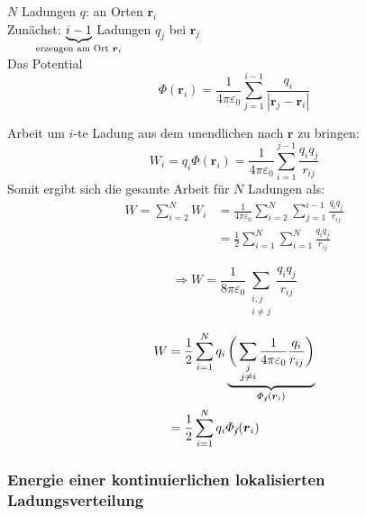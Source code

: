 \documentclass[titlepage,11pt,a4paper,ngerman]{report}
\renewcommand{\Phi}{\varPhi}
\newcommand{\kq}{\frac{1}{4\pi\epsilon_0}}
\newcommand{\summ}[2]{\sum_{#1}^{#2}}
\renewcommand{\vec}[1]{\boldsymbol{#1}}
\renewcommand{\epsilon}{\varepsilon}
\renewcommand{\paragraph}[1]{\subsubsection{#1}}
\begin{document}
$N$ Ladungen $q$: an Orten $\vec{r}_i$\\
Zunächst: $\underbrace{i - 1}_{\mathclap{\textrm{erzeugen am Ort } \vec{r}_i}}$ Ladungen $q_j$ bei $\vec{r}_j$\\
Das Potential
$$\Phi(\vec{r}_i) = \kq \summ{j = 1}{i - 1} \frac{q_i}{|\vec{r}_j - \vec{r}_i|}$$ 


Arbeit um $ i $-te Ladung aus dem unendlichen nach $ \vec{r} $ zu bringen:
\begin{equation*}
W_i = q_i \Phi(\vec{r}_i) = \frac{1}{4 \pi \epsilon_0} \sum_{i=1}^{j-1} \frac{q_i q_j}{r_{ij}}
\end{equation*}
Somit ergibt sich die gesamte Arbeit für $ N $ Ladungen als:
\begin{align*}
W = \sum_{i=2}^{N} W_i &= \frac{1}{4 \pi \epsilon_0} \sum_{i=2}^{N} \sum_{j=1}^{i-1} \frac{q_i q_j}{r_{ij}}\\
&= \frac{1}{2} \sum_{i=1}^{N} \sum_{i=1}^{N} \frac{q_i q_j}{r_{ij}}
\end{align*}

\begin{equation*}
\Rightarrow W = \frac{1}{8 \pi \epsilon_0} \sum_{\substack{i,j\\i\neq j}} \frac{q_i q_j}{r_{ij}}
\end{equation*}


\begin{align*}
W &= \frac{1}{2} \summ{i = 1}{N} q_i \underbrace{\bigg( \sum_{\substack{j\\ j \neq i}} \kq \frac{q_i}{r_{ij}}\bigg)}_{\Phi_{/ \hspace{-3.5pt}i}(\vec{r}_i)}\\
&= \frac{1}{2} \summ{i = 1}{N} q_i \Phi_{/ \hspace{-4pt}i}(\vec{r}_i)
\end{align*}

\paragraph{Energie einer kontinuierlichen lokalisierten Ladungsverteilung}
\end{document}
